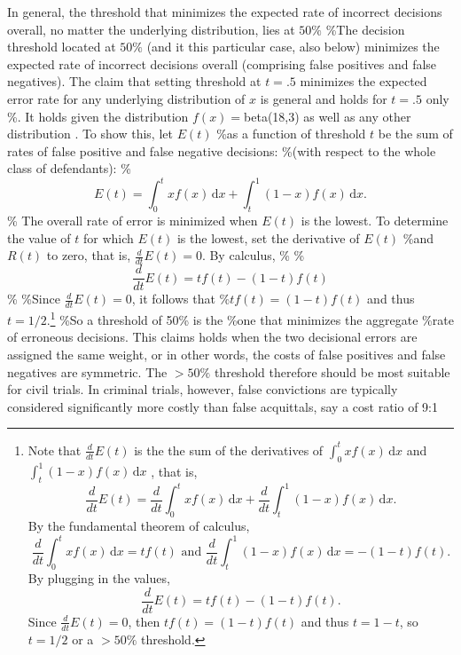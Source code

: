 \documentclass[10pt,dvipsnames,enabledeprecatedfontcommands]{scrartcl}
\begin{document}
In general, the threshold that minimizes the expected rate of incorrect
decisions overall, no matter the underlying distribution, lies at
\(50\%\) \%The decision threshold located at \(50\%\) (and it this
particular case, also below) minimizes
the
expected rate of incorrect decisions overall (comprising false positives
and false negatives). The claim that setting threshold at \(t=.5\)
minimizes the expected error rate for any underlying distribution of
\(x\) is general and holds for \(t=.5\) only \%. It holds given the
distribution \(f(x)=\)beta(18,3) as well as any other distribution
\citep{kaye1982limits, Kaye1999Clarifying-the-, cheng2015}. To show
this, let \(E(t)\) \%as a function of threshold \(t\) be the sum of
rates of false positive and false negative decisions: \%(with respect to
the whole class of defendants): \%
\[E(t) = \int_0^t \! x f(x) \, \mathrm{d}x + \int_t^1 \! (1-x) f(x) \, \mathrm{d}x.
\] \% The overall rate of error is minimized when \(E(t)\) is the
lowest. To determine the value of \(t\) for which \(E(t)\) is the
lowest, set the derivative of \(E(t)\) \%and \(R(t)\) to zero, that is,
\(\frac{d}{dt} E(t)= 0\). By calculus, \%
\%\[\frac{d}{dt}  E(t) = tf(t)  -(1-t)f(t)\] \% \%Since
\(\frac{d}{dt} E(t)= 0\), it follows that \%\(tf(t) = (1-t)f(t)\) and
thus
\(t=1/2\).\footnote{Note that $\frac{d}{dt}  E(t)$ is the the sum of the derivatives of $\int_0^t \! x f(x) \, \mathrm{d}x$ 
and 
$\int_t^1 \!(1-x) f(x) \, \mathrm{d}x$
, that is,
%
\[\frac{d}{dt} E(t) = \frac{d}{dt}  \int_0^t \! x f(x) \, \mathrm{d}x + \frac{d}{dt}  \int_t^1 \! (1-x) f(x) \, \mathrm{d}x.\]
%
By the fundamental theorem of calculus, 
%
\[\frac{d}{dt}   \int_0^t \! x f(x) \, \mathrm{d}x = tf(t) \text{ and }
\frac{d}{dt}   \int_t^1 \! (1-x) f(x) \, \mathrm{d}x = -(1-t)f(t). \]
%
By plugging in the values, 
%
\[\frac{d}{dt}  E(t) = tf(t)  -(1-t)f(t). \]
%
Since $\frac{d}{dt}  E(t)= 0$, then $tf(t)  = (1-t)f(t)$
and thus
$t  = 1-t$, so 
$t  = 1/2$ or a $>50\%$ threshold.
} \%So a threshold of 50\% is the \%one that minimizes the aggregate
\%rate of erroneous decisions. This claims holds when the two decisional
errors are assigned the same weight, or in other words, the costs of
false positives and false negatives are symmetric. The \(>50\%\)
threshold therefore should be most suitable for civil trials. In
criminal trials, however, false convictions are typically considered
significantly more costly than false acquittals, say a cost ratio of 9:1
\end{document}
